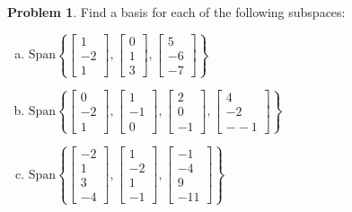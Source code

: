 \documentclass[10pt]{article}
\theoremstyle{definition}
\newtheorem{problem}[theorem]{Problem}
\newcommand{\1}[1]{\textbf{1}_{\left[#1\right]}} %
\begin{document}
\begin{problem}
  Find a basis for each of the following subspaces:
  \begin{enumerate}[(a)]
    \item $\text{Span}\left\{
      \begin{bmatrix}
        1\\-2\\1
      \end{bmatrix},
      \begin{bmatrix}
        0\\1\\3
      \end{bmatrix},
      \begin{bmatrix}
        5\\-6\\-7
      \end{bmatrix}
    \right\} $
    \item
    $\text{Span}\left\{
      \begin{bmatrix}
        0\\-2\\1
      \end{bmatrix},
      \begin{bmatrix}
        1\\-1\\0
      \end{bmatrix},
      \begin{bmatrix}
        2\\0\\-1
      \end{bmatrix},
      \begin{bmatrix}
        4\\-2\\--1
      \end{bmatrix}
    \right\} $
    \item $\text{Span}\left\{
      \begin{bmatrix}
        -2\\1\\3\\-4
      \end{bmatrix},
      \begin{bmatrix}
        1\\-2\\1\\-1
      \end{bmatrix},
      \begin{bmatrix}
        -1\\-4\\9\\-11
      \end{bmatrix}
    \right\} $
  \end{enumerate}
\end{problem}
\end{document}
